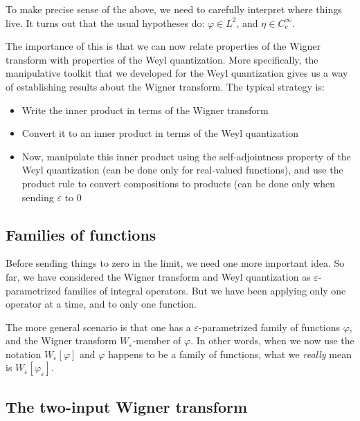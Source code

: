\documentclass[a4paper]{amsart}
\begin{document}
To make precise sense of the above, we need to carefully interpret
where things live. It turns out that the usual hypotheses do: $\varphi \in L^2$,
and $\eta \in C_c^\infty$.


The importance of this is that we can now relate properties of the
Wigner transform with properties of the Weyl quantization. More
specifically, the manipulative toolkit that we developed for the Weyl
quantization gives us a way of establishing results about the Wigner transform. The typical strategy is:

\begin{itemize}

\item Write the inner product in terms of the Wigner transform

\item Convert it to an inner product in terms of the Weyl quantization

\item Now, manipulate this inner product using the self-adjointness
  property of the Weyl quantization (can be done only for real-valued
  functions), and use the product rule to convert compositions to
  products (can be done only when sending $\varepsilon$ to $0$

\end{itemize}

\subsection{Families of functions}

Before sending things to zero in the limit, we need one more important
idea. So far, we have considered the Wigner transform and Weyl
quantization as $\varepsilon$-parametrized families of integral
operators. But we have been applying only one operator at a time,
and to only one function.

The more general scenario is that one has a $\varepsilon$-parametrized
family of functions $\varphi$, and the Wigner transform
$W_\varepsilon$-member of $\varphi$. In other words, when we now use the notation
$W_\varepsilon[\varphi]$ and $\varphi$ happens to be a family of functions, what we {\em really}
mean is $W_\varepsilon[\varphi_\varepsilon]$.

\subsection{The two-input Wigner transform}
\end{document}
